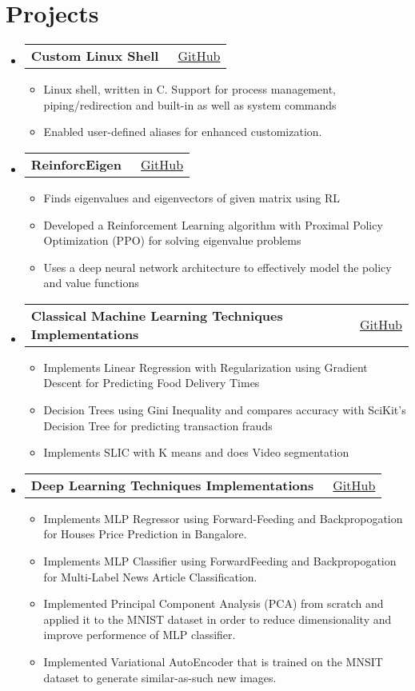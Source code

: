 \documentclass[a4paper,10pt]{article}
\makeatletter
\newcommand{\resumeItem}[1]{\item[\textcolor{bulletcolor}{\textbullet}] \small{#1}}
\newcommand{\resumeProjectHeading}[2]{
    \item
    \begin{tabular*}{0.97\textwidth}{l@{\extracolsep{\fill}}r}
        \textbf{#1} & {\small #2} \\
    \end{tabular*}\vspace{-7pt}
}
\makeatother
\begin{document}
\section{Projects}
\begin{itemize}[leftmargin=0.15in, label={}]        
    \resumeProjectHeading
        {\textbf{Custom Linux Shell}}{{\small\faGithub}\ \href{https://github.com/mayank3135432/osn-mp1}{GitHub}}
        \begin{itemize}[leftmargin=0.15in]
            \resumeItem{Linux shell, written in C. Support for process management, piping/redirection and built-in as well as system commands}
            \resumeItem{Enabled user-defined aliases for enhanced customization.}
        \end{itemize}
    \resumeProjectHeading
        {\textbf{ReinforcEigen}}{{\small\faGithub}\ \href{https://github.com/Vedp9984/ReinforceEigen}{GitHub}}
        \begin{itemize}[leftmargin=0.15in]
            \resumeItem{Finds eigenvalues and eigenvectors of given matrix using RL}
            \resumeItem{Developed a Reinforcement Learning algorithm with Proximal Policy Optimization (PPO) for solving eigenvalue problems}
            \resumeItem{Uses a deep neural network architecture to effectively model the policy and value functions}
        \end{itemize}
    \resumeProjectHeading
        {\textbf{Classical Machine Learning Techniques Implementations}}{{\small\faGithub}\ \href{https://github.com/mayank3135432/ML-DL-Implementations}{GitHub}}
        \begin{itemize}[leftmargin=0.15in]
            \resumeItem{Implements Linear Regression with Regularization using Gradient Descent for Predicting Food Delivery Times}
            \resumeItem{Decision Trees using Gini Inequality and compares accuracy with SciKit's Decision Tree for predicting transaction frauds}
            \resumeItem{Implements SLIC with K means and does Video segmentation}
        \end{itemize}
        
    \resumeProjectHeading
        {\textbf{Deep Learning Techniques Implementations}}{{\small\faGithub}\ \href{https://github.com/mayank3135432/ML-DL-Implementations}{GitHub}}
        \begin{itemize}[leftmargin=0.15in]
            \resumeItem{Implements MLP Regressor using Forward-Feeding and Backpropogation for Houses Price Prediction in Bangalore.}
            \resumeItem{Implements MLP Classifier using ForwardFeeding and Backpropogation for Multi-Label News Article Classification.}
            \resumeItem{Implemented Principal Component Analysis (PCA) from scratch and applied it to the MNIST dataset in order to reduce dimensionality and improve performence of MLP classifier.}
            \resumeItem{Implemented Variational AutoEncoder that is trained on the MNSIT dataset to generate similar-as-such new images. }
        \end{itemize}


\end{itemize}
\end{document}
